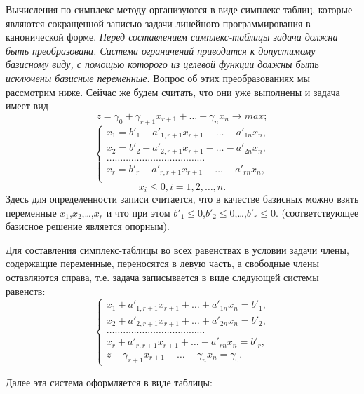 Вычисления по симплекс-методу организуются в виде симплекс-таблиц, которые являются сокращенной записью задачи линейного программирования в канонической форме. \textit{Перед составлением симплекс-таблицы задача должна быть преобразована. Система ограничений приводится к допустимому базисному виду, с помощью которого из целевой функции должны быть исключены базисные  переменные.} Вопрос об этих преобразованиях мы рассмотрим ниже. Сейчас же будем считать, что они уже выполнены и задача имеет вид
$$ z = \gamma_0 + \gamma_{r+1}x_{r+1} + \dots  + \gamma_nx_n \rightarrow max;$$
\begin{equation*}
\begin{cases}
x_1 = b'_1 - a'_{1,r+1}x_{r+1} - \dots - a'_{1n}x_n,\\
x_2 = b'_2 - a'_{2,r+1}x_{r+1} - \dots - a'_{2n}x_n,\\
\dots\dots\dots\dots\dots\dots\dots\dots\dots\dots\dots\dots\\
x_r = b'_r - a'_{r,r+1}x_{r+1} - \dots - a'_{rn}x_n,\\
\end{cases}
\end{equation*}
$$ x_i \leq 0, i = 1, 2, \dots , n.$$
Здесь для определенности записи считается, что в качестве базисных можно взять переменные $x_1$,$x_2$,\dots,$x_r$ и что при этом $b'_1 \leq 0$,$b'_2 \leq 0$,\dots,$b'_r \leq 0$. (соответствующее  базисное решение является опорным).

Для составления симплекс-таблицы во всех равенствах в условии  задачи члены, содержащие переменные, переносятся в левую часть, а свободные члены оставляются справа, т.е. задача записывается в виде следующей системы равенств:
\begin{equation*}
\begin{cases}
x_1 +  a'_{1,r+1}x_{r+1} + \dots + a'_{1n}x_n = b'_1,\\
x_2 +  a'_{2,r+1}x_{r+1} + \dots + a'_{2n}x_n = b'_2,\\
\dots\dots\dots\dots\dots\dots\dots\dots\dots\dots\dots\dots\\
x_r +  a'_{r,r+1}x_{r+1} + \dots + a'_{rn}x_n = b'_r,\\
z - \gamma_{r+1} x_{r+1} - \dots - \gamma_nx_n = \gamma_0.
\end{cases}
\end{equation*}

Далее эта система оформляется  в виде таблицы:

